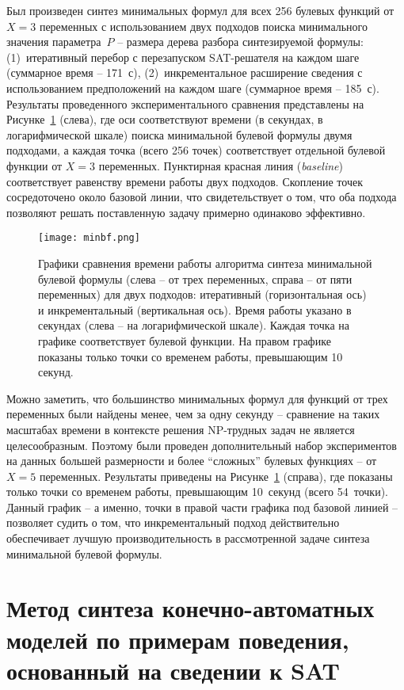 Был произведен синтез минимальных формул для всех 256 булевых функций от $X = 3$ переменных с использованием двух подходов поиска минимального значения параметра~$P$ \--- размера дерева разбора синтезируемой формулы: (1)~итеративный перебор с перезапуском SAT-решателя на каждом шаге (суммарное время \--- 171~с), (2)~инкрементальное расширение сведения с использованием предположений на каждом шаге (суммарное время \--- 185~с).
Результаты проведенного экспериментального сравнения представлены на Рисунке~\ref{fig:minbf} (слева), где оси соответствуют времени (в секундах, в логарифмической шкале) поиска минимальной булевой формулы двумя подходами, а каждая точка (всего 256 точек) соответствует отдельной булевой функции от $X = 3$ переменных.
Пунктирная красная линия (\textit{baseline}) соответствует равенству времени работы двух подходов.
Скопление точек сосредоточено около базовой линии, что свидетельствует о том, что оба подхода позволяют решать поставленную задачу примерно одинаково эффективно.

\begin{figure}[!t]
    \centering
    \texttt{[image: minbf.png]}
    \caption{Графики сравнения времени работы алгоритма синтеза минимальной булевой формулы (слева \--- от трех переменных, справа \--- от пяти переменных) для двух подходов: итеративный (горизонтальная ось) и инкрементальный (вертикальная ось). Время работы указано в секундах (слева \--- на логарифмической шкале). Каждая точка на графике соответствует булевой функции. На правом графике показаны только точки со временем работы, превышающим 10 секунд.}
    \label{fig:minbf}
\end{figure}

Можно заметить, что большинство минимальных формул для функций от трех переменных были найдены менее, чем за одну секунду \--- сравнение на таких масштабах времени в контексте решения NP-трудных задач не является целесообразным.
Поэтому были проведен дополнительный набор экспериментов на данных большей размерности и более \enquote{сложных} булевых функциях \--- от $X = 5$ переменных.
Результаты приведены на Рисунке~\ref{fig:minbf} (справа), где показаны только точки со временем работы, превышающим 10~секунд (всего 54~точки).
Данный график \--- а именно, точки в правой части графика под базовой линией \--- позволяет судить о том, что инкрементальный подход действительно обеспечивает лучшую производительность в рассмотренной задаче синтеза минимальной булевой формулы.


\section{Метод синтеза конечно-автоматных моделей по примерам поведения, основанный на сведении к SAT}%
\label{sec:automata-synthesis}

